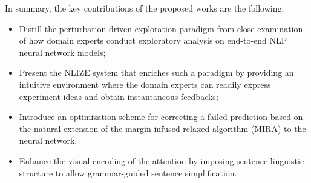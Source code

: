 In summary, the key contributions of the proposed works are the following:
\begin{itemize}
    \item Distill the perturbation-driven exploration paradigm from close examination of how domain experts conduct exploratory analysis on end-to-end NLP neural network models;
    
    \item Present the NLIZE system that enriches such a paradigm by providing an intuitive environment where the domain experts can readily express experiment ideas and obtain instantaneous feedbacks; 

    \item Introduce an optimization scheme for correcting a failed prediction based on the natural extension of the margin-infused relaxed algorithm (MIRA) to the neural network.
    
    \item Enhance the visual encoding of the attention by imposing sentence linguistic structure to allow grammar-guided sentence simplification.
\end{itemize}
%




